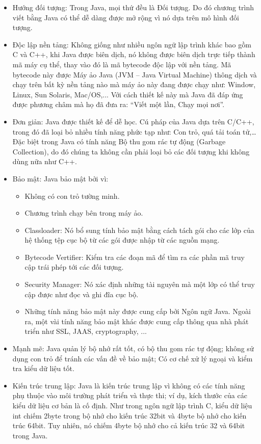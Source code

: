 \begin{itemize}
\item Hướng đối tượng: Trong Java, mọi thứ đều là Đối tượng. Do đó chương trình viết bằng Java có thể dễ dàng được mở rộng vì nó dựa trên mô hình đối tượng.
\item Độc lập nền tảng: Không giống như nhiều ngôn ngữ lập trình khác bao gồm C và C++, khi Java được biên dịch, nó không được biên dịch trực tiếp thành mã máy cụ thể, thay vào đó là mã bytecode độc lập với nền tảng. Mã bytecode này được Máy ảo Java (JVM – Java Virtual Machine) thông dịch và chạy trên bất kỳ nền tảng nào mà máy ảo này đang được chạy như: Window, Linux, Sun Solaris, Mac/OS,... Với cách thiết kế này mà Java đã đáp ứng được phương châm mà họ đã đưa ra: “Viết một lần, Chạy mọi nơi”.
\item Đơn giản: Java được thiết kế để dễ học. Cú pháp của Java dựa trên C/C++, trong đó đã loại bỏ nhiều tính năng phức tạp như: Con trỏ, quá tải toán tử,… Đặc biệt trong Java có tính năng Bộ thu gom rác tự động (Garbage Collection), do đó chúng ta không cần phải loại bỏ các đối tượng khi không dùng nữa như C++.
\item Bảo mật: Java bảo mật bởi vì:
\begin{itemize}
\item Không có con trỏ tường minh.
\item Chương trình chạy bên trong máy ảo.
\item Classloader: Nó bổ sung tính bảo mật bằng cách tách gói cho các lớp của hệ thống tệp cục bộ từ các gói được nhập từ các nguồn mạng.
\item Bytecode Vertifier: Kiểm tra các đoạn mã để tìm ra các phần mã truy cập trái phép tới các đối tượng.
\item Security Manager: Nó xác định những tài nguyên mà một lớp có thể truy cập được như đọc và ghi đĩa cục bộ.
\item Những tính năng bảo mật này được cung cấp bởi Ngôn ngữ Java. Ngoài ra, một vài tính năng bảo mật khác được cung cấp thông qua nhà phát triển như SSL, JAAS, cryptography, ...
\end{itemize}
\item Mạnh mẽ: Java quản lý bộ nhớ rất tốt, có bộ thu gom rác tự động; không sử dụng con trỏ để tránh các vấn đề về bảo mật; Có cơ chế xử lý ngoại và kiểm tra kiểu dữ liệu tốt.
\item Kiến trúc trung lập: Java là kiến trúc trung lập vì không có các tính năng phụ thuộc vào môi trường phát triển và thực thi; ví dụ, kích thước của các kiểu dữ liệu cơ bản là cố định. Như trong ngôn ngữ lập trình C, kiểu dữ liệu int chiếm 2byte trong bộ nhớ cho kiến trúc 32bit và 4byte bộ nhớ cho kiến trúc 64bit. Tuy nhiên, nó chiếm 4byte bộ nhớ cho cả kiến trúc 32 và 64bit trong Java.

\end{itemize}
